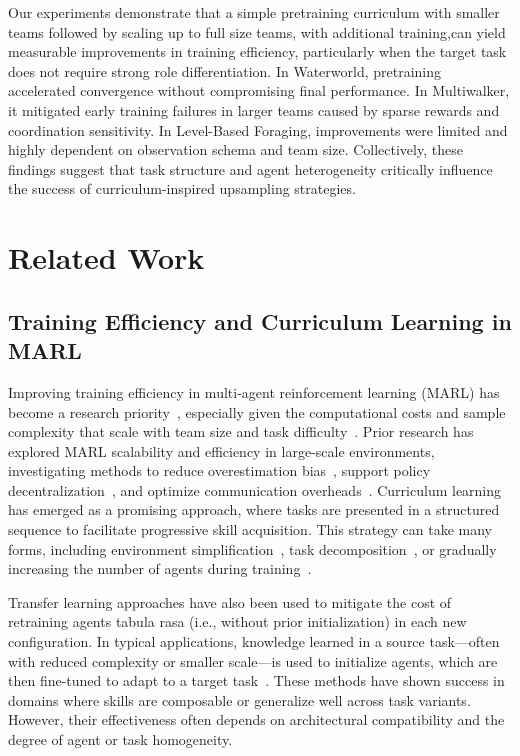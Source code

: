 Our experiments demonstrate that a simple pretraining curriculum with smaller teams followed by 
scaling up to full size teams, with additional training,can yield measurable improvements in 
training efficiency, particularly when the target task does not require strong role 
differentiation. 
In Waterworld, pretraining accelerated convergence without compromising final performance. 
In Multiwalker, it mitigated early training failures in larger teams caused by sparse 
rewards and coordination sensitivity. 
In Level-Based Foraging, improvements were limited and highly dependent on 
observation schema and team size. 
Collectively, these findings suggest that task structure and agent heterogeneity 
critically influence the success of curriculum-inspired upsampling strategies.

\section{Related Work}
\subsection{Training Efficiency and Curriculum Learning in MARL}

Improving training efficiency in multi-agent reinforcement learning (MARL) has become a research 
priority~\cite{canese2021,krouka2022}, especially given the computational costs and sample 
complexity that scale with team size and task difficulty~\cite{shoham2007,busoniu2008}. 
Prior research has explored MARL scalability and efficiency in large-scale environments, 
investigating methods to reduce overestimation bias~\cite{ackermann2019}, support policy 
decentralization~\cite{foerster2017,lowe2020}, and optimize communication 
overheads~\cite{sukhbaatar2016,wei2022}. Curriculum learning has emerged as a promising approach, 
where tasks are presented in a structured sequence to facilitate progressive skill acquisition. 
This strategy can take many forms, including environment simplification~\cite{shukla2022}, 
task decomposition~\cite{shi2023}, or gradually increasing the number of agents 
during training~\cite{smit2023, albrecht2024}.

Transfer learning approaches have also been used to mitigate the cost of retraining agents 
tabula rasa (i.e., without prior initialization) in each new configuration. 
In typical applications, knowledge learned in a source task—often with reduced 
complexity or smaller scale—is used to initialize agents, 
which are then fine-tuned to adapt to a target task~\cite{cui2022}. 
These methods have shown success in domains where skills are composable 
or generalize well across task variants. However, their effectiveness often 
depends on architectural compatibility and the degree of agent or task homogeneity.


